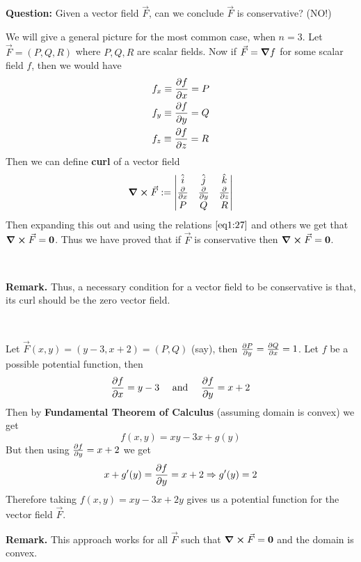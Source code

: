 \documentclass[../Analysis-3]{subfiles}
\begin{document}
\textbf{Question:} Given a vector field $\vec{F}$, can we conclude $\vec{F}$ is conservative? (NO!)

We will give a general picture for the most common case, when $n = 3$. Let $\vec{F} = (P,Q,R)$ where $P,Q,R$ are scalar fields. Now if $\vec{F} = \grad f$ for some scalar field $f$, then we would have
\begin{align}\label{eq1:27}
     & f_x \equiv \pdv{f}{x} = P \\
     & f_y \equiv \pdv{f}{y} = Q \\
     & f_z \equiv \pdv{f}{z} = R
\end{align}
Then we can define \textbf{curl} of a vector field
\[
    \curl \vec{F} := \begin{vmatrix}
        \hat{i}   & \hat{j}   & \hat{k}   \\
        \pdv{}{x} & \pdv{}{y} & \pdv{}{z} \\
        P         & Q         & R
    \end{vmatrix}
\]
Then expanding this out and using the relations $\ref{eq1:27}$ and others we get that $\curl \vec{F} = \mathbf{0}$. Thus we have proved that if $\vec{F}$ is conservative then $\curl \vec{F} = \mathbf{0}$.

\

\textbf{Remark.} Thus, a necessary condition for a vector field to be conservative is that, its curl should be the zero vector field.

\

\begin{Eg}{}{}
    Let $\vec{F}(x,y) = (y-3,x+2) = (P,Q)$ (say), then $\pdv{P}{y} = \pdv{Q}{x} = 1$. Let $f$ be a possible potential function, then
    \[
        \pdv{f}{x} = y-3 \quad \mbox{ and } \quad \pdv{f}{y} = x+2
    \]
    Then by \textbf{Fundamental Theorem of Calculus} (assuming domain is convex) we get
    \[
        f(x,y) = xy - 3x + g(y)
    \]
    But then using $\pdv{f}{y} = x+2$ we get
    \[
        x + g'(y) = \pdv{f}{y} = x+2 \Rightarrow g'(y) = 2
    \]
    Therefore taking $f(x,y) = xy - 3x + 2y$ gives us a potential function for the vector field $\vec{F}$.
\end{Eg}


\textbf{Remark.} This approach works for all $\vec{F}$ such that $\curl \vec{F} = \mathbf{0}$ and the domain is convex.
\end{document}
